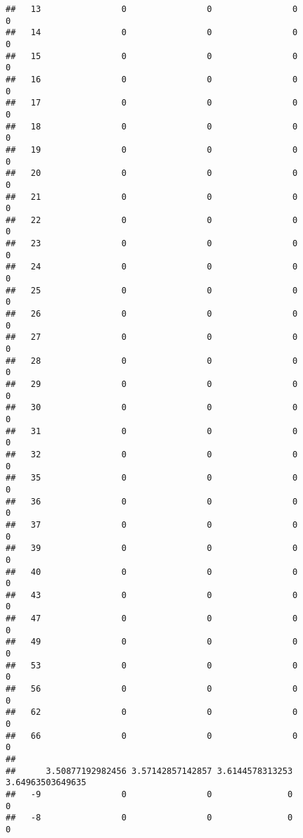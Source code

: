 \documentclass[]{article}
\begin{document}
\begin{verbatim}
##   13                0                0                0                0
##   14                0                0                0                0
##   15                0                0                0                0
##   16                0                0                0                0
##   17                0                0                0                0
##   18                0                0                0                0
##   19                0                0                0                0
##   20                0                0                0                0
##   21                0                0                0                0
##   22                0                0                0                0
##   23                0                0                0                0
##   24                0                0                0                0
##   25                0                0                0                0
##   26                0                0                0                0
##   27                0                0                0                0
##   28                0                0                0                0
##   29                0                0                0                0
##   30                0                0                0                0
##   31                0                0                0                0
##   32                0                0                0                0
##   35                0                0                0                0
##   36                0                0                0                0
##   37                0                0                0                0
##   39                0                0                0                0
##   40                0                0                0                0
##   43                0                0                0                0
##   47                0                0                0                0
##   49                0                0                0                0
##   53                0                0                0                0
##   56                0                0                0                0
##   62                0                0                0                0
##   66                0                0                0                0
##     
##      3.50877192982456 3.57142857142857 3.6144578313253 3.64963503649635
##   -9                0                0               0                0
##   -8                0                0               0                0

\end{verbatim}
\end{document}
